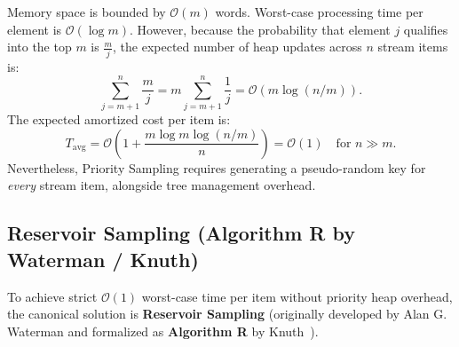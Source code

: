 \begin{property}
Memory space is bounded by $\mathcal{O}(m)$ words. Worst-case processing time per element is $\mathcal{O}(\log m)$. However, because the probability that element $j$ qualifies into the top $m$ is $\frac{m}{j}$, the expected number of heap updates across $n$ stream items is:
\begin{equation}
  \sum_{j=m+1}^n \frac{m}{j} = m \sum_{j=m+1}^n \frac{1}{j} = \mathcal{O}(m \log(n/m)).
\end{equation}
The expected amortized cost per item is:
\begin{equation}
  T_{\text{avg}} = \mathcal{O}\!\left(1 + \frac{m \log m \log(n/m)}{n}\right) = \mathcal{O}(1) \quad \text{for } n \gg m.
\end{equation}
Nevertheless, Priority Sampling requires generating a pseudo-random key for \emph{every} stream item, alongside tree management overhead.
\end{property}

\FloatBarrier
\subsection{Reservoir Sampling (Algorithm R by Waterman / Knuth)}
To achieve strict $\mathcal{O}(1)$ worst-case time per item without priority heap overhead, the canonical solution is \textbf{Reservoir Sampling} (originally developed by Alan G. Waterman and formalized as \textbf{Algorithm R} by Knuth~\cite{knuth1997}).

